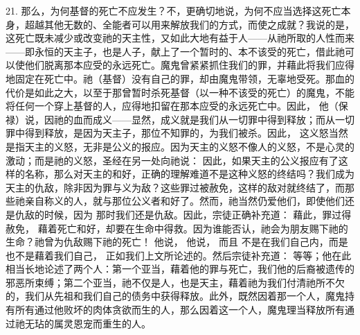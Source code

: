 21. 那么，为何基督的死亡不应发生？不，更确切地说，为何不应当选择这死亡本身，超越其他无数的、全能者可以用来解放我们的方式，而使之成就？我说的是，这死亡既未减少或改变祂的天主性，又如此大地有益于人——从祂所取的人性而来——即永恒的天主子，也是人子，献上了一个暂时的、本不该受的死亡，借此祂可以使他们脱离那本应受的永远死亡。魔鬼曾紧紧抓住我们的罪，并藉此将我们应得地固定在死亡中。祂（基督）没有自己的罪，却由魔鬼带领，无辜地受死。那血的代价是如此之大，以至于那曾暂时杀死基督（以一种不该受的死亡）的魔鬼，不能将任何一个穿上基督的人，应得地扣留在那本应受的永远死亡中。因此， 他（保禄）说，因祂的血而成义——显然，成义就是我们从一切罪中得到释放；而从一切罪中得到释放，是因为天主子，那位不知罪的，为我们被杀。因此， 这义怒当然是指天主的义怒，无非是公义的报应。因为天主的义怒不像人的义怒，不是心灵的激动；而是祂的义怒，圣经在另一处向祂说： 因此，如果天主的公义报应有了这样的名称，那么对天主的和好，正确的理解难道不是这种义怒的终结吗？我们成为天主的仇敌，除非因为罪与义为敌？这些罪过被赦免，这样的敌对就终结了，而那些祂亲自称义的人，就与那位公义者和好了。然而，祂当然仍爱他们，即使他们还是仇敌的时候，因为 那时我们还是仇敌。因此，宗徒正确补充道： 藉此，罪过得赦免， 藉着死亡和好，却要在生命中得救。因为谁能否认，祂会为朋友赐下祂的生命？祂曾为仇敌赐下祂的死亡！ 他说，  他说， 而且 不是在我们自己内，而是 也不是藉着我们自己， 正如我们上文所论述的。然后宗徒补充道： 等等；他在此相当长地论述了两个人：第一个亚当，藉着他的罪与死亡，我们他的后裔被遗传的邪恶所束缚；第二个亚当，祂不仅是人，也是天主，藉着祂为我们付清祂所不欠的，我们从先祖和我们自己的债务中获得释放。此外，既然因着那一个人，魔鬼持有所有通过他败坏的肉体贪欲而生的人，那么因着这一个人，魔鬼理当释放所有通过祂无玷的属灵恩宠而重生的人。\par


